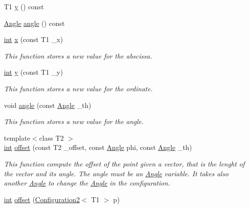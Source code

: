 \begin{DoxyCompactItemize}
T1 \mbox{\hyperlink{class_configuration2_a6f92f5478bb05304dae587203c8de9c1}{y}} () const
\item 
\mbox{\hyperlink{class_angle}{Angle}} \mbox{\hyperlink{class_configuration2_a00f073b1127aa9bf9e7a06a833a47555}{angle}} () const
\item 
\mbox{\hyperlink{draw_8hh_aa620a13339ac3a1177c86edc549fda9b}{int}} \mbox{\hyperlink{class_configuration2_ac8b1ca22acbfd0c59d145eb3ac42f39d}{x}} (const T1 \+\_\+x)
\begin{DoxyCompactList}\small\item\em This function stores a new value for the abscissa. \end{DoxyCompactList}\item 
\mbox{\hyperlink{draw_8hh_aa620a13339ac3a1177c86edc549fda9b}{int}} \mbox{\hyperlink{class_configuration2_a6cc23545dd1c7d17aa32c96126f1f727}{y}} (const T1 \+\_\+y)
\begin{DoxyCompactList}\small\item\em This function stores a new value for the ordinate. \end{DoxyCompactList}\item 
void \mbox{\hyperlink{class_configuration2_a8ff42470c34aaa1885df5974e8b7896d}{angle}} (const \mbox{\hyperlink{class_angle}{Angle}} \+\_\+th)
\begin{DoxyCompactList}\small\item\em This function stores a new value for the angle. \end{DoxyCompactList}\item 
{\footnotesize template$<$class T2 $>$ }\\\mbox{\hyperlink{draw_8hh_aa620a13339ac3a1177c86edc549fda9b}{int}} \mbox{\hyperlink{class_configuration2_a4c3bb49ce67ceb4b1b492cb7c093ea8c}{offset}} (const T2 \+\_\+offset, const \mbox{\hyperlink{class_angle}{Angle}} phi, const \mbox{\hyperlink{class_angle}{Angle}} \+\_\+th)
\begin{DoxyCompactList}\small\item\em This function compute the offset of the point given a vector, that is the lenght of the vector and its angle. The angle must be an {\ttfamily \mbox{\hyperlink{class_angle}{Angle}}} variable. It takes also another {\ttfamily \mbox{\hyperlink{class_angle}{Angle}}} to change the {\ttfamily \mbox{\hyperlink{class_angle}{Angle}}} in the configuration. \end{DoxyCompactList}\item 
\mbox{\hyperlink{draw_8hh_aa620a13339ac3a1177c86edc549fda9b}{int}} \mbox{\hyperlink{class_configuration2_abc07742a00822719024a8a58d003a6f1}{offset}} (\mbox{\hyperlink{class_configuration2}{Configuration2}}$<$ T1 $>$ p)

\end{DoxyCompactItemize}
